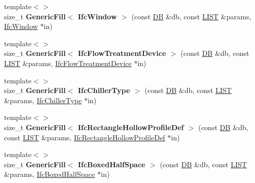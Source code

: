 \begin{DoxyCompactItemize}
\item 
\hypertarget{namespace_assimp_1_1_s_t_e_p_ae63bd917c961fed22feb715924ac5aef}{{\footnotesize template$<$$>$ }\\size\+\_\+t {\bfseries Generic\+Fill$<$ Ifc\+Window $>$} (const \hyperlink{class_assimp_1_1_s_t_e_p_1_1_d_b}{D\+B} \&db, const \hyperlink{class_assimp_1_1_s_t_e_p_1_1_e_x_p_r_e_s_s_1_1_l_i_s_t}{L\+I\+S\+T} \&params, \hyperlink{struct_assimp_1_1_i_f_c_1_1_ifc_window}{Ifc\+Window} $\ast$in)}\label{namespace_assimp_1_1_s_t_e_p_ae63bd917c961fed22feb715924ac5aef}

\item 
\hypertarget{namespace_assimp_1_1_s_t_e_p_a8523a733c44cd86854b3ce865d0421ab}{{\footnotesize template$<$$>$ }\\size\+\_\+t {\bfseries Generic\+Fill$<$ Ifc\+Flow\+Treatment\+Device $>$} (const \hyperlink{class_assimp_1_1_s_t_e_p_1_1_d_b}{D\+B} \&db, const \hyperlink{class_assimp_1_1_s_t_e_p_1_1_e_x_p_r_e_s_s_1_1_l_i_s_t}{L\+I\+S\+T} \&params, \hyperlink{struct_assimp_1_1_i_f_c_1_1_ifc_flow_treatment_device}{Ifc\+Flow\+Treatment\+Device} $\ast$in)}\label{namespace_assimp_1_1_s_t_e_p_a8523a733c44cd86854b3ce865d0421ab}

\item 
\hypertarget{namespace_assimp_1_1_s_t_e_p_a3a1d5f917dab4945acb886761d9cec28}{{\footnotesize template$<$$>$ }\\size\+\_\+t {\bfseries Generic\+Fill$<$ Ifc\+Chiller\+Type $>$} (const \hyperlink{class_assimp_1_1_s_t_e_p_1_1_d_b}{D\+B} \&db, const \hyperlink{class_assimp_1_1_s_t_e_p_1_1_e_x_p_r_e_s_s_1_1_l_i_s_t}{L\+I\+S\+T} \&params, \hyperlink{struct_assimp_1_1_i_f_c_1_1_ifc_chiller_type}{Ifc\+Chiller\+Type} $\ast$in)}\label{namespace_assimp_1_1_s_t_e_p_a3a1d5f917dab4945acb886761d9cec28}

\item 
\hypertarget{namespace_assimp_1_1_s_t_e_p_afa9ef23831cc9f73ec1b85ab217ef87c}{{\footnotesize template$<$$>$ }\\size\+\_\+t {\bfseries Generic\+Fill$<$ Ifc\+Rectangle\+Hollow\+Profile\+Def $>$} (const \hyperlink{class_assimp_1_1_s_t_e_p_1_1_d_b}{D\+B} \&db, const \hyperlink{class_assimp_1_1_s_t_e_p_1_1_e_x_p_r_e_s_s_1_1_l_i_s_t}{L\+I\+S\+T} \&params, \hyperlink{struct_assimp_1_1_i_f_c_1_1_ifc_rectangle_hollow_profile_def}{Ifc\+Rectangle\+Hollow\+Profile\+Def} $\ast$in)}\label{namespace_assimp_1_1_s_t_e_p_afa9ef23831cc9f73ec1b85ab217ef87c}

\item 
\hypertarget{namespace_assimp_1_1_s_t_e_p_ae1d3a61dfa42c3a707709730c50dc07d}{{\footnotesize template$<$$>$ }\\size\+\_\+t {\bfseries Generic\+Fill$<$ Ifc\+Boxed\+Half\+Space $>$} (const \hyperlink{class_assimp_1_1_s_t_e_p_1_1_d_b}{D\+B} \&db, const \hyperlink{class_assimp_1_1_s_t_e_p_1_1_e_x_p_r_e_s_s_1_1_l_i_s_t}{L\+I\+S\+T} \&params, \hyperlink{struct_assimp_1_1_i_f_c_1_1_ifc_boxed_half_space}{Ifc\+Boxed\+Half\+Space} $\ast$in)}\label{namespace_assimp_1_1_s_t_e_p_ae1d3a61dfa42c3a707709730c50dc07d}


\end{DoxyCompactItemize}
